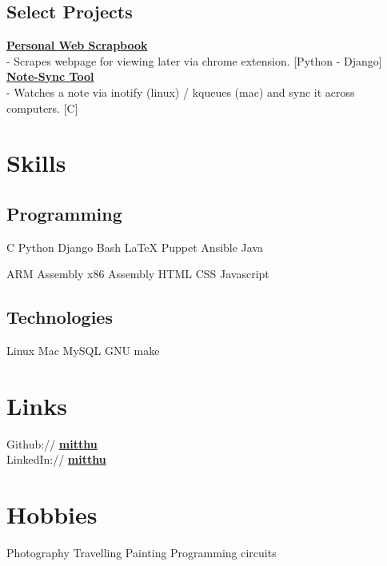 \documentclass[]{deedy}
\newcommand{\linksymbol}{\Mundus}
\begin{document}
\begin{minipage}[t]{0.33\textwidth}
\subsection{Select Projects}
\textbf{\href{https://bitbucket.org/mitthu/capsule/src/}{Personal Web Scrapbook \linksymbol}}\\
- Scrapes webpage for viewing later via chrome extension. [Python - Django]\\[1.5ex]

\textbf{\href{https://github.com/mitthu/note-sync}{Note-Sync Tool \linksymbol}}\\
- Watches a note via inotify (linux) / kqueues (mac) and sync it across computers. [C]

\section{Skills}
\subsection{Programming}
C \textbullet{} Python \textbullet{} Django \textbullet{} Bash \textbullet{} \LaTeX \textbullet{} Puppet \textbullet{} Ansible \textbullet{} Java
\sectionsep

ARM Assembly \textbullet{} x86 Assembly \textbullet{} HTML \textbullet{} CSS \textbullet{} Javascript
\sectionsep

\subsection{Technologies}
Linux \textbullet{} Mac \textbullet{} MySQL \textbullet{} GNU make

\section{Links} 
Github:// \href{https://github.com/mitthu}{\textbf{mitthu}} \\
LinkedIn://  \href{https://www.linkedin.com/in/mitthu}{\textbf{mitthu}}

\section{Hobbies}
Photography \textbullet{} Travelling \textbullet{} Painting \textbullet{} Programming circuits

\end{minipage} \hfill
\end{document}
